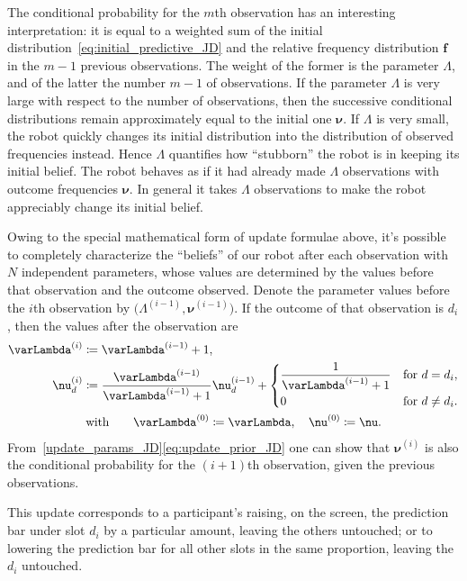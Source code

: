 \documentclass[\ifafour a4paper,12pt,\else a5paper,10pt,\fi%
onecolumn,oneside,article,%
british%
]{memoir}
\theoremstyle{remark}
\theoremstyle{innote}
\newcommand*{\defd}{\coloneqq}
\renewcommand*{\|}{\mathpunct{|}}
\newcommand*{\yff}{f}
\newcommand*{\yf}{\bm{\yff}}
\newcommand*{\yN}{\varLambda}
\newcommand*{\yNo}[1]{\yN^{(#1)}}
\newcommand*{\ynn}{\nu}
\newcommand*{\yn}{\bm{\nu}}
\newcommand*{\yno}[1]{\yn^{(#1)}}
\newcommand*{\ynno}[1]{\ynn^{(#1)}}
\begin{document}
The conditional probability for the $m$th observation has an interesting
interpretation: it is equal to a weighted sum of the initial
distribution~\eqref{eq:initial_predictive_JD} and the relative frequency
distribution $\yf$ in the $m-1$ previous observations. The weight of the
former is the parameter $\yN$, and of the latter the number $m-1$ of
observations. If the parameter $\yN$ is very large with respect to the
number of observations, then the successive conditional distributions
remain approximately equal to the initial one $\yn$. If $\yN$ is very
small, the robot quickly changes its initial distribution into the
distribution of observed frequencies instead. Hence $\yN$ quantifies how
\enquote{stubborn} the robot is in keeping its initial belief. The robot
behaves as if it had already made $\yN$ observations with outcome
frequencies $\yn$. In general it takes $\yN$ observations to make the robot
appreciably change its initial belief.

Owing to the special mathematical form of update formulae above, it's
possible to completely characterize the \enquote{beliefs} of our robot
after each observation with $N$ independent parameters, whose values are
determined by the values before that observation and the outcome observed.
Denote the parameter values before the $i$th observation by
$\bigl( \yNo{i-1}, \yno{i-1} \bigr)$. If the outcome of that observation is
$d_i$, then the values after the observation are
\begin{equation}
  \label{update_params_JD}
  \begin{gathered}
  \begin{aligned}
    \yNo{i} &\defd \yNo{i-1}+1,
    \\
    \ynno{i}_d &\defd \frac{\yNo{i-1}}{\yNo{i-1}+1}\ynno{i-1}_d +
    \begin{dcases}
      \frac{1}{\yNo{i-1}+1} &\text{for $d=d_{i}$},
      \\
      0 &\text{for $d\ne d_{i}$}.
    \end{dcases}
  \end{aligned}
  \\\text{with}\qquad
  \yNo{0}\defd\yN,
  \quad
  \yno{0} \defd\yn.
  \end{gathered}
\end{equation}
From~\eqref{update_params_JD}\eqref{eq:update_prior_JD} one can show that
$\yno{i}$ is also the conditional probability for the $(i+1)$th
observation, given the previous observations.

This update corresponds to a participant's raising, on the screen, the
prediction bar under slot $d_{i}$ by a particular amount, leaving the
others untouched; or to lowering the prediction bar for all other slots in
the same proportion, leaving the $d_{i}$ untouched.
\end{document}
